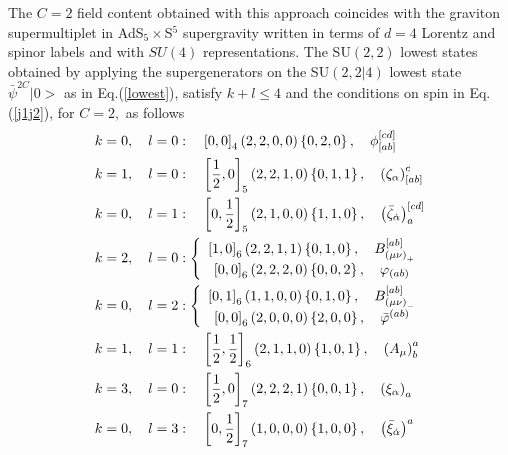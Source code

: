 \documentclass[a4paper,aps,preprint,nofootinbib]{revtex4}
\begin{document}
The $C=2$ field content obtained with this approach coincides with the
graviton supermultiplet in AdS$_{5}\times$S$^{5}$ supergravity written in
terms of $d=4$ Lorentz and spinor labels and with $SU(4)$ representations.
The SU$\left( 2,2\right) $ lowest states obtained by applying the
supergenerators on the SU$\left( 2,2|4\right) $ lowest state $\bar{\psi}%
^{2C}|0>$ as in Eq.(\ref{lowest}), satisfy $k+l\leq4$ and the conditions on
spin in Eq.(\ref{j1j2}), for $C=2,$ as follows
\begin{align}
k & =0,\quad l=0:\quad\left[ 0,0\right] _{4}\left( 2,2,0,0\right) \left\{
0,2,0\right\} ,\quad\phi_{\left[ ab\right] }^{\left[ cd\right] } \\
k & =1,\quad l=0:\quad\left[ \frac{1}{2},0\right] _{5}\left( 2,2,1,0\right)
\left\{ 0,1,1\right\} ,\quad\left( \zeta_{\alpha}\right) _{\left[ ab\right]
}^{c} \\
k & =0,\quad l=1:\quad\left[ 0,\frac{1}{2}\right] _{5}\left( 2,1,0,0\right)
\left\{ 1,1,0\right\} ,\quad\left( \bar{\zeta}_{\dot {\alpha}}\right) _{a}^{%
\left[ cd\right] } \\
k & =2,\quad l=0:\left\{
\begin{array}{c}
\left[ 1,0\right] _{6}\left( 2,2,1,1\right) \left\{ 0,1,0\right\} ,\quad
B_{\left( \mu\nu\right) _{+}}^{\left[ ab\right] } \\
\left[ 0,0\right] _{6}\left( 2,2,2,0\right) \left\{ 0,0,2\right\}
,\quad\varphi_{\left( ab\right) }%
\end{array}
\right. \\
k & =0,\quad l=2:\left\{
\begin{array}{c}
\left[ 0,1\right] _{6}\left( 1,1,0,0\right) \left\{ 0,1,0\right\} ,\quad
B_{\left( \mu\nu\right) _{-}}^{\left[ ab\right] } \\
\left[ 0,0\right] _{6}\left( 2,0,0,0\right) \left\{ 2,0,0\right\} ,\quad\bar{%
\varphi}^{\left( ab\right) }%
\end{array}
\right. \\
k & =1,\quad l=1:\quad\left[ \frac{1}{2},\frac{1}{2}\right] _{6}\left(
2,1,1,0\right) \left\{ 1,0,1\right\} ,\quad\left( A_{\mu}\right) _{b}^{a} \\
k & =3,\quad l=0:\quad\left[ \frac{1}{2},0\right] _{7}\left( 2,2,2,1\right)
\left\{ 0,0,1\right\} ,\quad\left( \xi_{\alpha}\right) _{a} \\
k & =0,\quad l=3:\quad\left[ 0,\frac{1}{2}\right] _{7}\left( 1,0,0,0\right)
\left\{ 1,0,0\right\} ,\quad\left( \bar{\xi}_{\dot{\alpha}}\right) ^{a} \\

\end{align}
\end{document}
